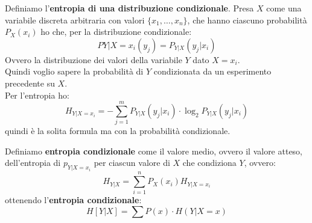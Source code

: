 \documentclass[a4paper,12pt, oneside]{book}
\begin{document}
\begin{definizione}
  Definiamo l'\textbf{entropia di una distribuzione condizionale}. Presa $X$
  come una variabile discreta arbitraria con valori $\{x_1,\ldots,x_n\}$, che
  hanno ciascuno probabilità $P_X(x_i)$ ho che, per la distribuzione
  condizionale:
  \[P{Y|X=x_i}(y_j)=P_{Y|X}(y_j|x_i)\]
  Ovvero la distribuzione dei valori della variabile $Y$ dato $X=x_i$.\\
  Quindi voglio sapere la probabilità di $Y$ condizionata da un esperimento
  precedente su $X$.\\
  Per l'entropia ho:
  \[H_{Y|X=x_i}=-\sum_{j=1}^m P_{Y|X}(y_j|x_i)\cdot \log_2 P_{Y|X}(y_j|x_i)\]
  quindi è la solita formula ma con la probabilità condizionale.
\end{definizione}
\begin{definizione}
  Definiamo \textbf{entropia condizionale} come il valore medio, ovvero il
  valore atteso, dell'entropia di $p_{Y|X=x_i}$ per ciascun valore di $X$ che
  condiziona $Y$, ovvero:
  \[H_{Y|X}=\sum_{i=1}^n P_X(x_i)H_{Y|X=x_i}\]
  ottenendo l'\textbf{entropia condizionale}:
  \[H[Y|X]=\sum P(x)\cdot H(Y|X=x)\]
\end{definizione}
\end{document}
